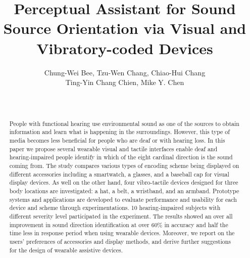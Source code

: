 \documentclass{sigchi}
\begin{document}
\title{Perceptual Assistant for Sound Source Orientation via Visual and Vibratory-coded Devices}

\author{ 
	\alignauthor Chung-Wei Bee, Tzu-Wen Chang, Chiao-Hui Chang
	\\ Ting-Yin Chang Chien, Mike Y. Chen\\
	\\
	\\
}


\maketitle

\begin{abstract}
People with functional hearing use environmental sound as one of the sources to obtain information and learn what is happening in the surroundings. However, this type of media becomes less beneficial for people who are deaf or with hearing loss. In this paper we propose several wearable visual and tactile interfaces enable deaf and hearing-impaired people identify in which of the eight cardinal direction is the sound coming from. The study compares various types of encoding scheme being displayed on different accessories including a smartwatch, a glasses, and a baseball cap for visual display devices. As well on the other hand, four vibro-tactile devices designed for three body locations are investigated: a hat, a belt, a wristband, and an armband. Prototype systems and applications are developed to evaluate performance and usability for each device and scheme through experimentations. 10 hearing-impaired subjects with different severity level participated in the experiment. The results showed an over all improvement in sound direction identification at over 60\% in accuracy and half the time less in response period when using wearable devices. Moreover, we report on the users' preferences of accessories and display methods, and derive further suggestions for the design of wearable assistive devices.
\end{abstract}

\end{document}
